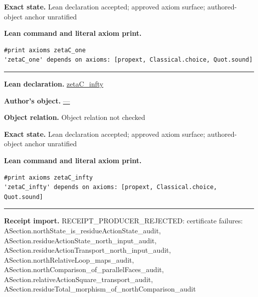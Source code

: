 \documentclass[11pt]{article}
\theoremstyle{plain}
\theoremstyle{definition}
\theoremstyle{remark}
\begin{document}
\begin{tcolorbox}[provenancecard,title={6. Definition - Compactified classical zeta},title after break={6. Definition - Compactified classical zeta (continued)}]
\par\textbf{Exact state.} Lean declaration accepted; approved axiom surface; authored-object anchor unratified
\par\smallskip\textbf{Lean command and literal axiom print.}
\begin{Verbatim}[breaklines=true,breakanywhere=true,fontsize=\small]
#print axioms zetaC_one
'zetaC_one' depends on axioms: [propext, Classical.choice, Quot.sound]
\end{Verbatim}
\medskip\hrule\medskip
\textbf{Lean declaration.} \url{zetaC_infty}
\par\textbf{Author's object.} \url{—}
\par\textbf{Object relation.} Object relation not checked
\par\textbf{Exact state.} Lean declaration accepted; approved axiom surface; authored-object anchor unratified
\par\smallskip\textbf{Lean command and literal axiom print.}
\begin{Verbatim}[breaklines=true,breakanywhere=true,fontsize=\small]
#print axioms zetaC_infty
'zetaC_infty' depends on axioms: [propext, Classical.choice, Quot.sound]
\end{Verbatim}
\medskip\hrule\medskip
\textbf{Receipt import.} \textcolor{KgtRed}{RECEIPT\_PRODUCER\_REJECTED: certificate failures: ASection.northState\_is\_residueActionState\_audit, ASection.residueActionState\_north\_input\_audit, ASection.residueActionTransport\_north\_input\_audit, ASection.northRelativeLoop\_maps\_audit, ASection.northComparison\_of\_parallelFaces\_audit, ASection.relativeActionSquare\_transport\_audit, ASection.residueTotal\_morphism\_of\_northComparison\_audit}
\end{tcolorbox}
\medskip
\end{document}
